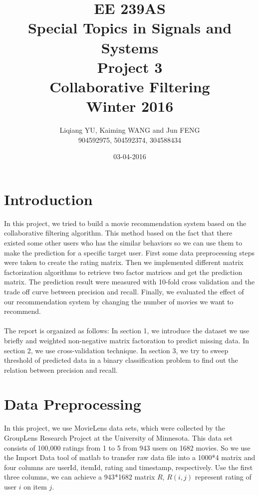 \documentclass{article}
\begin{document}
\begin{titlepage}
\title{EE 239AS \\Special Topics in Signals and Systems\\Project 3\\Collaborative Filtering\\Winter 2016} 
\author{Liqiang YU, Kaiming WANG and Jun FENG\\
904592975, 504592374, 304588434} 
\date{03-04-2016}
\end{titlepage}

\maketitle
\newpage
\tableofcontents
\newpage
\section{Introduction}
In this project, we tried to build a movie recommendation system based on the collaborative filtering algorithm. This method based on the fact that there existed some other users who has the similar behaviors so we can use them to make the prediction for a specific target user. First some data preprocessing steps were taken to create the rating matrix. Then we implemented different matrix factorization algorithms to retrieve two factor matrices and get the prediction matrix. The prediction result were measured with 10-fold cross validation and the trade off curve between precision and recall. Finally, we evaluated the effect of our recommendation system by changing the number of movies we want to recommend.\\
\\
The report is organized as follows: In section 1, we introduce the dataset we use briefly and weighted non-negative matrix factoration to predict missing data. In section 2, we use cross-validation technique. In section 3, we try to sweep threshold of predicted data in a binary classification problem to find out the relation between precision and recall.
\section{Data Preprocessing}
In this project, we use MovieLens data sets, which were collected by the GroupLens Research Project at the University of Minnesota. This data set consists of 100,000 ratings from 1 to 5 from 943 users on 1682 movies. So we use the Import Data tool of matlab to transfer raw data file into a 1000*4 matrix and four columns are userId, itemId, rating and timestamp, respectively. Use the first three columns, we can achieve a 943*1682 matrix $R$, $R(i,j)$ represent rating of user $i$ on item $j$.
\end{document}
